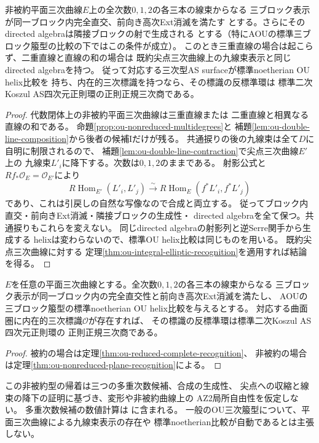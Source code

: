 \begin{theorem}[非被約平面三次曲線表示の帰着]
\label{thm:ou-nonreduced-plane-recognition}
非被約平面三次曲線$E$上の全次数$0,1,2$の各三本の線束からなる
三ブロック表示が同一ブロック内完全直交、前向き高次Ext消滅を満たす
とする。さらにそのdirected algebraは隣接ブロックの射で生成される
とする（特にAOUの標準三ブロック箙型の比較の下ではこの条件が成立）。
このとき三重直線の場合は起こらず、二重直線と直線の和の場合は
既約尖点三次曲線上の九線束表示と同じdirected algebraを持つ。
従って対応する三次型AS surfaceが標準noetherian OU helix比較を
持ち、内在的三次標識を持つなら、その標識の反標準環は
標準二次Koszul AS四次元正則環の正則正規三次商である。
\end{theorem}
\begin{proof}
代数閉体上の非被約平面三次曲線は三重直線または
二重直線と相異なる直線の和である。
命題\ref{prop:ou-nonreduced-multidegrees}と
補題\ref{lem:ou-double-line-composition}から後者の候補Iだけが残る。
共通捩りの後の九線束は全て$D$に自明に制限されるので、
補題\ref{lem:ou-double-line-contraction}で尖点三次曲線$E'$上の
九線束$L'_i$に降下する。次数は$0,1,2$のままである。
射影公式と$Rf_*\mathcal O_E=\mathcal O_{E'}$により
\[
 R\operatorname{Hom}_{E'}(L'_i,L'_j)
 \xrightarrow{\ \sim\ }
 R\operatorname{Hom}_{E}(f^*L'_i,f^*L'_j)
\]
であり、これは引戻しの自然な写像なので合成と両立する。
従ってブロック内直交・前向きExt消滅・隣接ブロックの生成性・
directed algebraを全て保つ。共通捩りもこれらを変えない。
同じdirected algebraの射影列と逆Serre関手から生成する
helixは変わらないので、標準OU helix比較は同じものを用いる。
既約尖点三次曲線に対する
定理\ref{thm:ou-integral-elliptic-recognition}を適用すれば結論を得る。
\end{proof}

\begin{theorem}[平面三次曲線による九線束表示の認識]
\label{thm:ou-all-plane-cubic-recognition}
$E$を任意の平面三次曲線とする。全次数$0,1,2$の各三本の線束からなる
三ブロック表示が同一ブロック内の完全直交性と前向き高次Ext消滅を満たし、
AOUの三ブロック箙型の標準noetherian OU helix比較を与えるとする。
対応する曲面圏に内在的三次標識$\mathcal O$が存在すれば、
その標識の反標準環は標準二次Koszul AS四次元正則環の
正則正規三次商である。
\end{theorem}
\begin{proof}
被約の場合は定理\ref{thm:ou-reduced-complete-recognition}、
非被約の場合は定理\ref{thm:ou-nonreduced-plane-recognition}による。
\end{proof}

\begin{remark}
この非被約型の帰着は三つの多重次数候補、合成の生成性、
尖点への収縮と線束の降下の証明に基づき、変形や非被約曲線上の
AZ2局所自由性を仮定しない。
多重次数候補の数値計算は
に含まれる。
一般のOU三次箙型について、平面三次曲線による九線束表示の存在や
標準noetherian比較が自動であるとは主張しない。
\end{remark}

